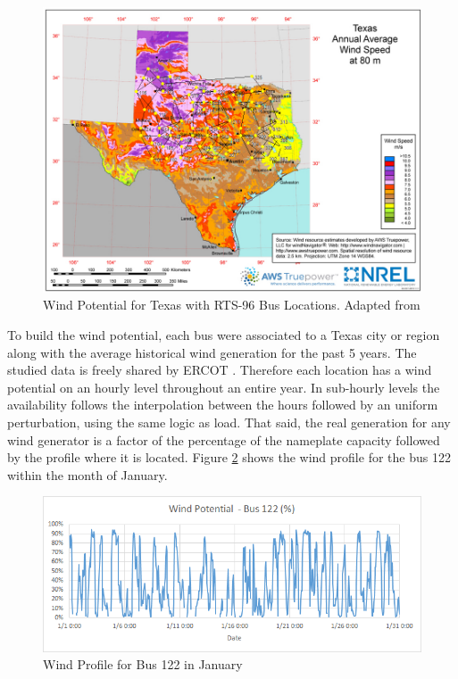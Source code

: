 \documentclass[12pt,LUDisStyle,twosided]{book}
\begin{document}
\begin{figure}[h!] 
  \includegraphics[width=\textwidth,keepaspectratio]{texasWindProfileWithBuses.png}
  \caption{Wind Potential for Texas with RTS-96 Bus Locations. Adapted from \cite{texasWindProfile} }
  \label{fig:texasWindProfile}
\end{figure}


To build the wind potential, each bus were associated to a Texas city or region along with the average historical wind generation for the past 5 years. The studied data is freely shared by ERCOT \cite{ercotGenerationWind}. Therefore each location has a wind potential on an hourly level throughout an entire year. In sub-hourly levels the availability follows the interpolation between the hours followed by an uniform perturbation, using the same logic as load. That said, the real generation for any wind generator is a factor of the percentage of the nameplate capacity followed by the profile where it is located. Figure \ref{fig:windProfileBus122January} shows the wind profile for the bus 122 within the month of January.

\begin{figure}[h!] 
  \includegraphics[width=\textwidth,keepaspectratio]{windPotentialBus122.png}
  \caption{Wind Profile for Bus 122 in January}
  \label{fig:windProfileBus122January}
\end{figure}
\end{document}
